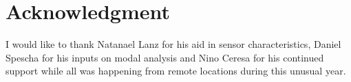 \chapter*{Acknowledgment}

I would like to thank Natanael Lanz for his aid in sensor characteristics, Daniel Spescha for his inputs on modal analysis and Nino Ceresa for his continued support while all was happening from remote locations during this unusual year.
